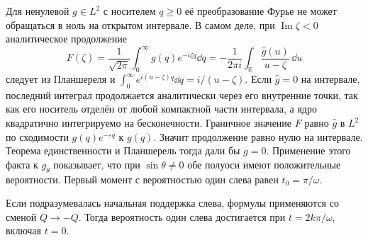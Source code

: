 \documentclass[11pt,a4paper]{article}
\begin{document}
Для ненулевой \(g\in L^2\) с носителем \(q\ge0\)
её преобразование Фурье не может обращаться в ноль на открытом
интервале. В самом деле, при \(\operatorname{Im}\zeta<0\)
аналитическое продолжение
\[
 F(\zeta)=\frac1{\sqrt{2\pi}}\int_0^\infty g(q)e^{-i\zeta q}\dd q
    =-\frac1{2\pi i}\int_\mathbb R\frac{\widehat g(u)}{u-\zeta}\,\dd u
\]
следует из Планшереля и
\(\int_0^\infty e^{i(u-\zeta)q}\dd q=i/(u-\zeta)\).
Если \(\widehat g=0\) на интервале, последний интеграл продолжается
аналитически через его внутренние точки, так как его носитель
отделён от любой компактной части интервала, а ядро квадратично
интегрируемо на бесконечности. Граничное значение \(F\) равно
\(\widehat g\) в \(L^2\) по сходимости \(g(q)e^{-\varepsilon q}\)
к \(g(q)\). Значит продолжение равно нулю на интервале.
Теорема единственности и Планшерель тогда дали бы \(g=0\).
Применение этого факта к \(g_\theta\) показывает, что при
\(\sin\theta\ne0\) обе полуоси имеют положительные вероятности.
Первый момент с вероятностью один слева равен \(t_0=\pi/\omega\).

Если подразумевалась начальная поддержка слева, формулы применяются
со сменой \(Q\to-Q\). Тогда вероятность один слева достигается
при \(t=2k\pi/\omega\), включая \(t=0\).
\end{document}
